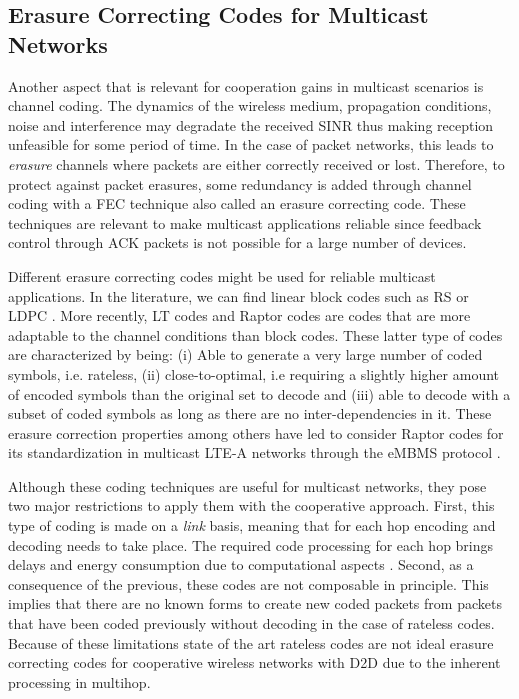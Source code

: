 \subsection{Erasure Correcting Codes for Multicast Networks}
\label{sec:erasure_codes}
Another aspect that is relevant for cooperation gains in multicast scenarios is channel coding. The dynamics of the wireless medium, propagation conditions, noise and interference may degradate the received \ac{SINR} thus making reception unfeasible for some period of time. In the case of packet networks, this leads to \textit{erasure} channels where packets are either correctly received or lost. Therefore, to protect against packet erasures, some redundancy is added through channel coding with a \ac{FEC} technique also called an erasure correcting code. These techniques are relevant to make multicast applications reliable since feedback control through \ac{ACK} packets is not possible for a large number of devices.

Different erasure correcting codes might be used for reliable multicast applications. In the literature, we can find linear block codes such as \ac{RS} \cite{reed1960polynomial} or \ac{LDPC} \cite{gallager1962low}. More recently, \ac{LT} codes \cite{luby2002lt} and Raptor codes \cite{shokrollahi2006raptor} are codes that are more adaptable to the channel conditions than block codes. These latter type of codes are characterized by being: (i) Able to generate a very large number of coded symbols, i.e. rateless, (ii) close-to-optimal, i.e requiring a slightly higher amount of encoded symbols than the original set to decode and (iii) able to decode with a subset of coded symbols as long as there are no inter-dependencies in it. These erasure correction properties among others have led to consider Raptor codes for its standardization in multicast \ac{LTE-A} networks through the \ac{eMBMS} protocol \cite{embms2014general}.

Although these coding techniques are useful for multicast networks, they pose two major restrictions to apply them with the cooperative approach. First, this type of coding is made on a \textit{link} basis, meaning that for each hop encoding and decoding needs to take place. The required code processing for each hop brings delays and energy consumption due to computational aspects \cite{toemoeskoezi2015packet}. Second, as a consequence of the previous, these codes are not composable in principle. This implies that there are no known forms to create new coded packets from packets that have been coded previously without decoding in the case of rateless codes. Because of these limitations state of the art rateless codes are not ideal erasure correcting codes for cooperative wireless networks with \ac{D2D} due to the inherent processing in multihop.

